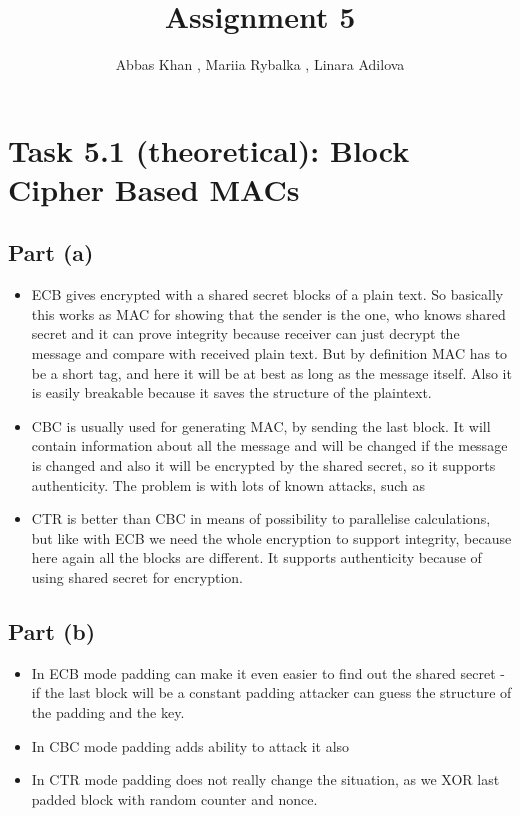 \documentclass{article}
\title{Assignment 5}
\author{Abbas Khan , Mariia Rybalka , Linara Adilova}
\begin{document}
\maketitle 

\section*{Task 5.1 (theoretical): Block Cipher Based MACs}
\subsection*{Part (a)}
\begin{itemize}
\item ECB gives encrypted with a shared secret blocks of a plain text. So basically this works as MAC for showing that the sender is the one, who knows shared secret and it can prove integrity because receiver can just decrypt the message and compare with received plain text. But by definition MAC has to be a short tag, and here it will be at best as long as the message itself. Also it is easily breakable because it saves the structure of the plaintext.
\item CBC is usually used for generating MAC, by sending the last block. It will contain information about all the message and will be changed if the message is changed and also it will be encrypted by the shared secret, so it supports authenticity. The problem is with lots of known attacks, such as 
\item CTR is better than CBC in means of possibility to parallelise calculations, but like with ECB we need the whole encryption to support integrity, because here again all the blocks are different. It supports authenticity  because of using shared secret for encryption. 
\end{itemize}
\subsection*{Part (b)}
\begin{itemize}
\item In ECB mode padding can make it even easier to find out the shared secret - if the last block will be a constant padding attacker can guess the structure of the padding and the key.
\item In CBC mode padding adds ability to attack it also
\item In CTR mode padding does not really change the situation, as we XOR last padded block with random counter and nonce.
\end{itemize}
\end{document}
